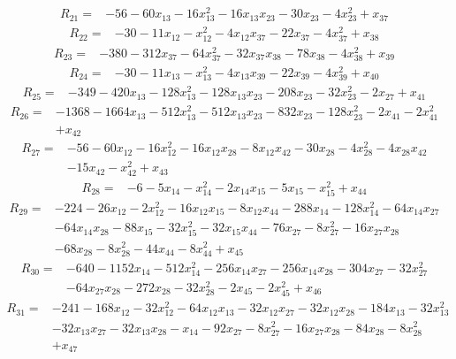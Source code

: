 \[\begin{aligned}R_{21}={}&-56-60x_{13}-16x_{13}^{2}-16x_{13}x_{23}-30x_{23}-4x_{23}^{2}+x_{37}
\end{aligned}\]
\[\begin{aligned}R_{22}={}&-30-11x_{12}-x_{12}^{2}-4x_{12}x_{37}-22x_{37}-4x_{37}^{2}+x_{38}
\end{aligned}\]
\[\begin{aligned}R_{23}={}&-380-312x_{37}-64x_{37}^{2}-32x_{37}x_{38}-78x_{38}-4x_{38}^{2}+x_{39}
\end{aligned}\]
\[\begin{aligned}R_{24}={}&-30-11x_{13}-x_{13}^{2}-4x_{13}x_{39}-22x_{39}-4x_{39}^{2}+x_{40}
\end{aligned}\]
\[\begin{aligned}R_{25}={}&-349-420x_{13}-128x_{13}^{2}-128x_{13}x_{23}-208x_{23}-32x_{23}^{2}-2x_{27}+x_{41}
\end{aligned}\]
\[\begin{aligned}R_{26}={}&-1368-1664x_{13}-512x_{13}^{2}-512x_{13}x_{23}-832x_{23}-128x_{23}^{2}-2x_{41}-2x_{41}^{2}
\\&+x_{42}
\end{aligned}\]
\[\begin{aligned}R_{27}={}&-56-60x_{12}-16x_{12}^{2}-16x_{12}x_{28}-8x_{12}x_{42}-30x_{28}-4x_{28}^{2}-4x_{28}x_{42}
\\&-15x_{42}-x_{42}^{2}+x_{43}
\end{aligned}\]
\[\begin{aligned}R_{28}={}&-6-5x_{14}-x_{14}^{2}-2x_{14}x_{15}-5x_{15}-x_{15}^{2}+x_{44}
\end{aligned}\]
\[\begin{aligned}R_{29}={}&-224-26x_{12}-2x_{12}^{2}-16x_{12}x_{15}-8x_{12}x_{44}-288x_{14}-128x_{14}^{2}-64x_{14}x_{27}
\\&-64x_{14}x_{28}-88x_{15}-32x_{15}^{2}-32x_{15}x_{44}-76x_{27}-8x_{27}^{2}-16x_{27}x_{28}
\\&-68x_{28}-8x_{28}^{2}-44x_{44}-8x_{44}^{2}+x_{45}
\end{aligned}\]
\[\begin{aligned}R_{30}={}&-640-1152x_{14}-512x_{14}^{2}-256x_{14}x_{27}-256x_{14}x_{28}-304x_{27}-32x_{27}^{2}
\\&-64x_{27}x_{28}-272x_{28}-32x_{28}^{2}-2x_{45}-2x_{45}^{2}+x_{46}
\end{aligned}\]
\[\begin{aligned}R_{31}={}&-241-168x_{12}-32x_{12}^{2}-64x_{12}x_{13}-32x_{12}x_{27}-32x_{12}x_{28}-184x_{13}-32x_{13}^{2}
\\&-32x_{13}x_{27}-32x_{13}x_{28}-x_{14}-92x_{27}-8x_{27}^{2}-16x_{27}x_{28}-84x_{28}-8x_{28}^{2}
\\&+x_{47}
\end{aligned}\]

